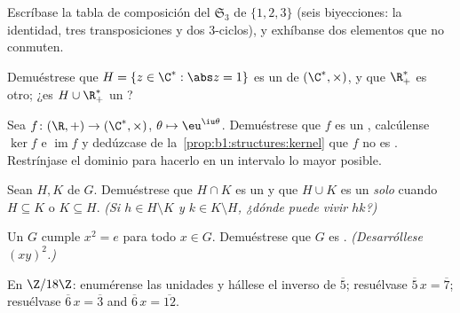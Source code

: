 \begin{exercise}[$\star$]\label{exo:b1:structures:3}
Escríbase la tabla de composición del 
$\mathfrak{S}_3$ de $\{1,2,3\}$ (seis biyecciones: la identidad, tres
transposiciones y dos $3$-ciclos), y exhíbanse dos elementos que no conmuten.
\end{exercise}

\begin{exercise}[$\star$]\label{exo:b1:structures:4}
Demuéstrese que $H = \{z \in \C^* : \abs z = 1\}$ es un  de $(\C^*,
\times)$, y que $\R_+^*$ es otro; ¿es $H \cup \R_+^*$ un
?
\end{exercise}

\begin{exercise}[$\star\star$]\label{exo:b1:structures:5}
Sea $f \colon (\R, +) \to (\C^*, \times)$, $\theta \mapsto
\eu^{\iu\theta}$. Demuéstrese que $f$ es un , calcúlense
$\ker f$ e $\operatorname{im} f$ y dedúzcase de
la~\cref{prop:b1:structures:kernel} que $f$ no es . Restrínjase
el dominio para hacerlo  en un intervalo lo mayor posible.
\end{exercise}

\begin{exercise}[$\star\star$]\label{exo:b1:structures:6}
Sean $H, K$  de $G$. Demuéstrese que $H \cap K$ es un
 y que $H \cup K$ es un  \emph{solo} cuando
$H \subseteq K$ o $K \subseteq H$. \emph{(Si $h \in H \setminus K$ y
$k \in K \setminus H$, ¿dónde puede vivir $hk$?)}
\end{exercise}

\begin{exercise}[$\star\star$]\label{exo:b1:structures:7}
Un  $G$ cumple $x^2 = e$ para todo $x \in G$. Demuéstrese que $G$
es . \emph{(Desarróllese $(xy)^2$.)}
\end{exercise}

\begin{exercise}[$\star\star$]\label{exo:b1:structures:8}
En $\Z/18\Z$: enumérense las unidades y hállese el inverso de
$\overline 5$; resuélvase $\overline 5\, x = \overline 7$; resuélvase $\overline 6\, x =
\overline 3$ and $\overline 6\, x = \overline{12}$.
\end{exercise}

